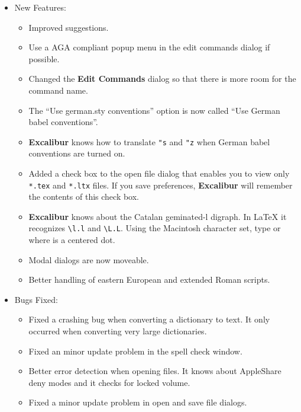 \documentclass[11pt,titlepage]{article}
\newcommand{\ex}{\textbf{Excalibur}}
\begin{document}
\begin{itemize}
\item New Features:

  \begin{itemize}
  \item Improved suggestions.

  \item Use a AGA compliant popup menu in the edit commands dialog if
    possible.

  \item Changed the \textbf{Edit Commands} dialog so that there is
    more room for the command name.

  \item The ``Use german.sty conventions'' option is now called ``Use
    German babel conventions''.

  \item \ex{} knows how to translate \texttt{"s} and \texttt{"z} when
    German babel conventions are turned on.

  \item Added a check box to the open file dialog that enables you to
    view only \texttt{*.tex} and \texttt{*.ltx} files.  If you save
    preferences, \ex{} will remember the contents of this check box.

  \item \ex{} knows about the Catalan geminated-l digraph.  In
    \LaTeX{} it recognizes \verb+\l.l+ and \verb+\L.L+.  Using the
    Macintosh character set, type
     or
     where
    \latex{$\cdot$} is a centered dot.

  \item Modal dialogs are now moveable.

  \item Better handling of eastern European and extended Roman
    scripts.
  \end{itemize}

\item Bugs Fixed:

  \begin{itemize}
  \item Fixed a crashing bug when converting a dictionary to text.  It
    only occurred when converting very large dictionaries.

  \item Fixed an minor update problem in the spell check window.

  \item Better error detection when opening files.  It knows about
    AppleShare deny modes and it checks for locked volume.

  \item Fixed a minor update problem in open and save file dialogs.

  \end{itemize}

\end{itemize}
\end{document}
